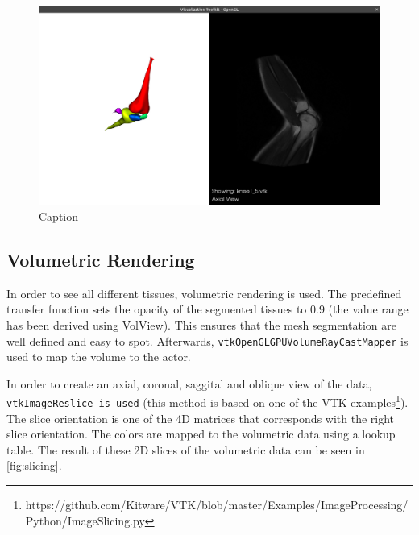 \documentclass{article}
\begin{document}
\begin{figure}[H]
    \centering
    \includegraphics[width=\textwidth]{graphics/only_volume.png}
    \caption{Caption}
    \label{fig:only_segmentations}
\end{figure}

\subsection{Volumetric Rendering}
In order to see all different tissues, volumetric rendering is used. The predefined transfer function sets the opacity of the segmented tissues to 0.9 (the value range has been derived using VolView). This ensures that the mesh segmentation are well defined and easy to spot. Afterwards, \texttt{vtkOpenGLGPUVolumeRayCastMapper} is used to map the volume to the actor.

In order to create an axial, coronal, saggital and oblique view of the data, \texttt{vtkImageReslice is used} (this method is based on one of the VTK examples\footnote{https://github.com/Kitware/VTK/blob/master/Examples/ImageProcessing/Python/ImageSlicing.py}). The slice orientation is one of the 4D matrices that corresponds with the right slice orientation. The colors are mapped to the volumetric data using a lookup table. The result of these 2D slices of the volumetric data can be seen in \ref{fig:slicing}.
\end{document}
